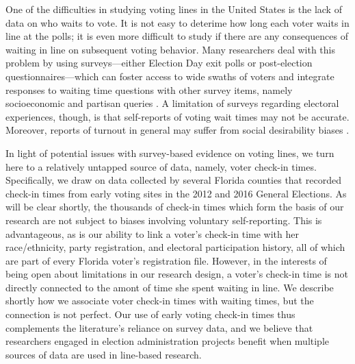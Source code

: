 \documentclass[12pt,titlepage]{article}
\begin{document}
One of the difficulties in studying voting lines in the United States
is the lack of data on who waits to vote.  It is not easy to deterime how long each voter waits in line at the polls; it is even more 
difficult to study if there are any consequences of waiting in line on subsequent voting behavior.  Many
researchers deal with this problem by using surveys---either Election
Day exit polls or post-election questionnaires---which can foster
access to wide swaths of voters and integrate responses to waiting
time questions with other survey items, namely socioeconomic and
partisan queries \citep{stewart:waitingtovote2012}.  A limitation of surveys regarding electoral
experiences, though, is that self-reports of voting wait times may not
be accurate.  Moreover, reports of turnout in general may suffer from
social desirability biases \citep{karpbrockington:overreport}.


In light of potential issues with survey-based evidence on voting
lines, we turn here to a relatively untapped source of data, namely,
voter check-in times. Specifically, we draw on data collected by
several Florida counties that recorded check-in times from early
voting sites in the 2012 and 2016 General Elections.  As will be clear
shortly, the thousands of check-in times which form the basis of our
research are not subject to biases involving voluntary self-reporting.
This is advantageous, as is our ability to link a voter's check-in
time with her race/ethnicity, party registration, and electoral
participation history, all of which are part of every Florida voter's
registration file.  However, in the interests of being open about
limitations in our research design, a voter's check-in time is not
directly connected to the amont of time she spent waiting in line.  We
describe shortly how we associate voter check-in times with waiting
times, but the connection is not perfect.  Our use of early voting
check-in times thus complements the literature's reliance on survey
data, and we believe that researchers engaged in election
administration projects benefit when multiple sources of data are used
in line-based research.
\end{document}
